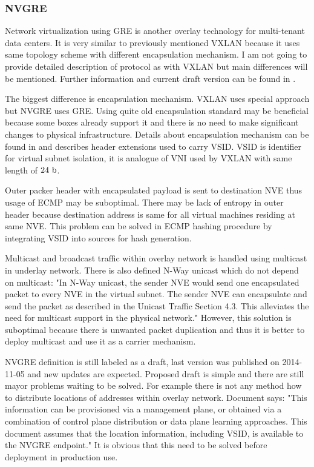 \subsubsection{NVGRE}
Network virtualization using \Ac{GRE} is another overlay technology for multi-tenant data centers. It is very similar to previously mentioned \Ac{VXLAN} because it uses same topology scheme with different encapsulation mechanism. I am not going to provide detailed description of protocol as with \Ac{VXLAN} but main differences will be mentioned. Further information and current draft version can be found in \cite{draft-nvgre}\cite{rfc2748}\cite{rfc2890}.

The biggest difference is encapsulation mechanism. \Ac{VXLAN} uses special approach but \Ac{NVGRE} uses \Ac{GRE}.  Using quite old encapsulation standard may be beneficial because some boxes already support it and there is no need to make significant changes to physical infrastructure. Details about encapsulation mechanism can be found in \cite{rfc2748} and \cite{rfc2890} describes header extensions used to carry \Ac{VSID}. \Ac{VSID} is identifier for virtual subnet isolation, it is analogue of \Ac{VNI} used by \Ac{VXLAN} with same length of $24~\mathrm{b}$.

Outer packer header with encapsulated payload is sent to destination \Ac{NVE} thus usage of \Ac{ECMP} may be suboptimal. There may be lack of entropy in outer header because destination address is same for all virtual machines residing at same \Ac{NVE}. This problem can be solved in \Ac{ECMP} hashing procedure by integrating \Ac{VSID} into sources for hash generation.

Multicast and broadcast traffic within overlay network is handled using multicast in underlay network. There is also defined N-Way unicast which do not depend on multicast: "In N-Way unicast, the sender NVE would send one encapsulated packet to every NVE in the virtual subnet. The sender NVE can encapsulate and send the packet as described in the Unicast Traffic Section 4.3. This alleviates the need for multicast support in the physical network." \cite{draft-nvgre}
However, this solution is suboptimal because there is unwanted packet duplication and thus it is better to deploy multicast and use it as a carrier mechanism.

\Ac{NVGRE} definition \cite{draft-nvgre} is still labeled as a draft, last version was published on 2014-11-05 and new updates are expected. Proposed draft is  simple and there are still mayor problems waiting to be solved. For example there is not any method how to distribute locations of addresses within overlay network. Document \cite{draft-nvgre} says: "This information can be provisioned via a management plane, or obtained via a combination of control plane distribution or data plane learning approaches. This document assumes that the location information, including VSID, is available to the NVGRE endpoint." It is obvious that this need to be solved before deployment in production use. 

